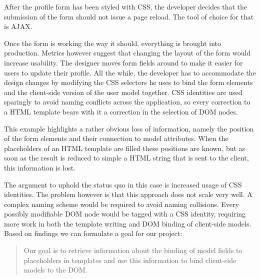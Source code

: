 \documentclass[thesis.tex]{subfiles}
\begin{document}
\begin{shaded}
\label{sec:scenario}
After the profile form has been styled with CSS, the developer decides that
the submission of the form should not issue a page reload. The tool of choice
for that is AJAX.

Once the form is working the way it should, everything is brought into
production. Metrics however suggest that changing the layout of the form would
increase usability.
The designer moves form fields around to make it easier for users to update
their profile.
All the while, the developer has to accommodate the design changes by modifying
the CSS selectors he uses to bind the form elements and the client-side version
of the user model together.
CSS identities are used sparingly to avoid naming conflicts across the
application, so every correction to a HTML template bears with it a correction
in the selection of DOM nodes.
\end{shaded}
This example highlights a rather obvious loss of information, namely
the position of the form elements and their connection to model attributes.
When the placeholders of an HTML template are filled these positions are known,
but as soon as the result is reduced to simple a HTML string that is sent
to the client, this information is lost.

The argument to uphold the status quo in this case is increased usage of
CSS identities. The problem however is that this approach does not scale very well.
A complex naming scheme would be required to avoid naming collisions.
Every possibly modifiable DOM node would be tagged with a CSS identity,
requiring more work in both the template writing and DOM binding of
client-side models.
Based on findings we can formulate a goal for our project:
\begin{quote}
Our goal is to retrieve information about the binding of model fields to
placeholders in templates and use this information to bind client-side
models to the DOM.
\end{quote}
\end{document}
